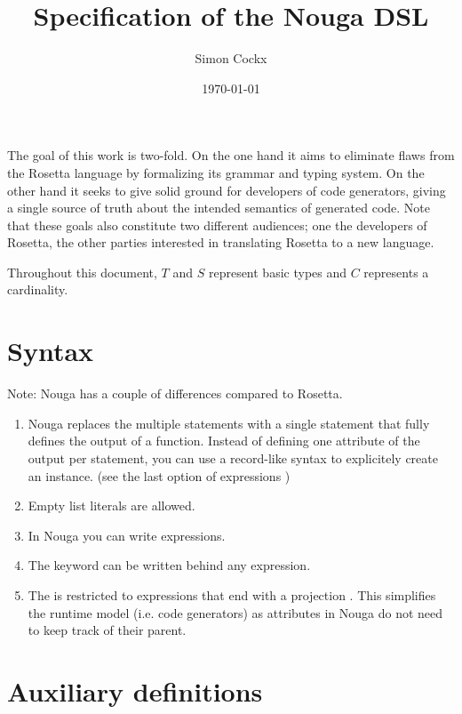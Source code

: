 \documentclass[english,11pt,a4paper]{article}
\title{Specification of the Nouga DSL}
\author{Simon Cockx}
\date{\today}
\begin{document}
\maketitle



The goal of this work is two-fold. On the one hand it aims to eliminate flaws from the Rosetta language by formalizing its grammar and typing system. On the other hand it seeks to give solid ground for developers of code generators, giving a single source of truth about the intended semantics of generated code. Note that these goals also constitute two different audiences; one the developers of Rosetta, the other parties interested in translating Rosetta to a new language.

Throughout this document, $T$ and $S$ represent basic types and $C$ represents a cardinality.

\section{Syntax}



Note: Nouga has a couple of differences compared to Rosetta.
\begin{enumerate}
\item Nouga replaces the multiple  statements with a single statement that fully defines the output of a function. Instead of defining one attribute of the output per  statement, you can use a record-like syntax to explicitely create an instance. (see the last option of expressions )
\item Empty list literals are allowed.
\item In Nouga you can write  expressions.
\item The  keyword can be written behind any expression.
\item The   is restricted to expressions that end with a projection \lit{->} . This simplifies the runtime model (i.e. code generators) as attributes in Nouga do not need to keep track of their parent.
\end{enumerate}


\section{Auxiliary definitions}


\end{document}
